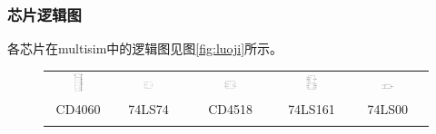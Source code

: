 \documentclass[12pt]{article}
\begin{document}
\subsubsection{芯片逻辑图}
各芯片在multisim中的逻辑图见图\ref{fig:luoji}所示。
\begin{figure}[h]
\centering
\begin{tabular}{ccccc}
\includegraphics[width=0.18\textwidth]{TIM20180923144839.png}&\includegraphics[width=0.18\textwidth]{TIM20180923145234.png}&\includegraphics[width=0.18\textwidth]{TIM20180923145642.png}&\includegraphics[width=0.18\textwidth]{TIM20180923150127.png}&\includegraphics[width=0.18\textwidth]{TIM20180923150834.png}\\
CD4060&74LS74&CD4518&74LS161&74LS00\\
\\

\end{tabular}
\end{figure}
\end{document}
